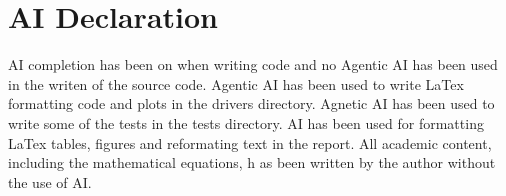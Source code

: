 \section*{AI Declaration}
AI completion has been on when writing code and no Agentic AI has been used
in the writen of the source code. Agentic AI has been used to 
write LaTex formatting code and plots in the drivers directory. 
Agnetic AI has been used to write some of the tests in the tests directory.
AI has been used for formatting LaTex tables, figures and reformating text
in the report. All academic content, including the mathematical equations, h
as been written by the author without the use of AI.
